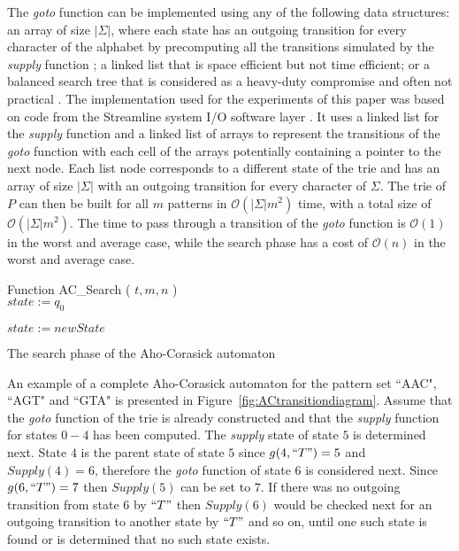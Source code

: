 \documentclass{ws-ijait}
\begin{document}
The \textit{goto} function can be implemented using any of the following data structures: an array of size $|\Sigma|$, where each state has an outgoing transition for every character of the alphabet by precomputing all the transitions simulated by the \textit{supply} function \cite{Navarro2002}; a linked list that is space efficient but not time efficient; or a balanced search tree that is considered as a heavy-duty compromise and often not practical \cite{Dori2006}. The implementation used for the experiments of this paper was based on code from the Streamline system I/O software layer \cite{WEB03}. It uses a linked list for the \textit{supply} function and a linked list of arrays to represent the transitions of the \textit{goto} function with each cell of the arrays potentially containing a pointer to the next node. Each list node corresponds to a different state of the trie and has an array of size $|\Sigma|$ with an outgoing transition for every character of $\Sigma$. The trie of $P$ can then be built for all $m$ patterns in $\mathcal{O}(|\Sigma|m^2)$ time, with a total size of $\mathcal{O}(|\Sigma|m^2)$. The time to pass through a transition of the \textit{goto} function is $\mathcal{O}(1)$ in the worst and average case, while the search phase has a cost of $\mathcal{O}(n)$ in the worst and average case.

\begin{algorithm}[H]

Function AC\_Search ( $t, m, n$ )\\

$state := q_0$\\
 {
	
	
	$state := newState$\\
	
}

\caption{The search phase of the Aho-Corasick automaton}
\label{compl:aho_corasick_search}
\end{algorithm}

An example of a complete Aho-Corasick automaton for the pattern set ``AAC", ``AGT" and ``GTA" is presented in Figure~\ref{fig:ACtransitiondiagram}. Assume that the \textit{goto} function of the trie is already constructed and that the \textit{supply} function for states $0 - 4$ has been computed. The \textit{supply} state of state $5$ is determined next. State $4$ is the parent state of state $5$ since $g(4,``T") = 5$ and $Supply(4) = 6$, therefore the \textit{goto} function of state $6$ is considered next. Since $g(6,``T") = 7$ then $Supply(5)$ can be set to $7$. If there was no outgoing transition from state $6$ by $``T"$ then $Supply(6)$ would be checked next for an outgoing transition to another state by $``T"$ and so on, until one such state is found or is determined that no such state exists.
\end{document}
